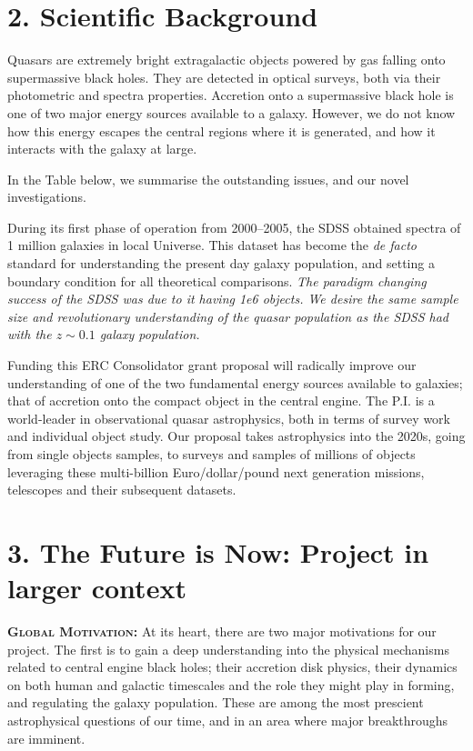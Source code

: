 \documentclass[oneside, a4paper, onecolumn, 11pt]{article}
\begin{document}
\noindent
\section*{\textcolor{Cerulean}{2. Scientific Background}}
Quasars are extremely bright extragalactic objects powered by gas
falling onto supermassive black holes.  They are detected in optical
surveys, both via their photometric and spectra properties.  Accretion
onto a supermassive black hole is one of two major energy sources
available to a galaxy.  However, we do not know how this energy
escapes the central regions where it is generated, and how it
interacts with the galaxy at large.

\smallskip
\smallskip
\noindent
In the Table below, we summarise the outstanding issues, and our novel investigations. 

\smallskip
\smallskip




\smallskip
\smallskip
\noindent
During its first phase of operation from 2000–2005, the SDSS obtained spectra 
of 1 million galaxies in local Universe. This dataset has become the {\it de facto} standard 
for understanding the present day galaxy population, and setting a boundary 
condition for all theoretical comparisons. 
{\it The paradigm changing success of the SDSS was due to it having 1e6 objects. 
We desire the same sample size and revolutionary understanding of the quasar 
population as the SDSS had with the $z\sim0.1$ galaxy population.}


\smallskip
\smallskip
\noindent
Funding this ERC Consolidator grant proposal will radically improve
our understanding of one of the two fundamental energy sources
available to galaxies; that of accretion onto the compact object in
the central engine.
The P.I. is a world-leader in observational quasar astrophysics, both
in terms of survey work and individual object study.
Our proposal takes astrophysics into the 2020s, going from single
objects samples, to surveys and samples of millions of objects
leveraging these multi-billion Euro/dollar/pound next generation
missions, telescopes and their subsequent datasets.



\section*{\textcolor{Cerulean}{3. The Future is Now: Project in larger context}}
\textbf{\textsc{\textcolor{Cerulean}{Global Motivation:}}}
At its heart, there are two major motivations for our project.  The
first is to gain a deep understanding into the physical mechanisms
related to central engine black holes; their accretion disk physics,
their dynamics on both human and galactic timescales and the role they
might play in forming, and regulating the galaxy population. These are
among the most prescient astrophysical questions of our time, and in
an area where major breakthroughs are imminent.
\end{document}
